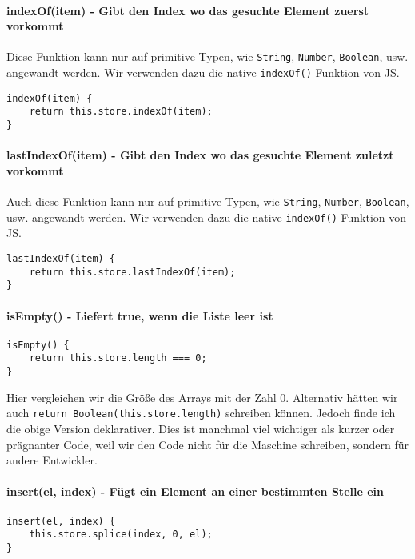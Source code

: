 \documentclass{book}
\begin{document}
\paragraph{indexOf(item) - Gibt den Index wo das gesuchte Element zuerst vorkommt} Diese Funktion kann nur auf primitive Typen, wie \lstinline|String|, \lstinline|Number|, \lstinline|Boolean|, usw. angewandt werden. Wir verwenden dazu die native \lstinline|indexOf()| Funktion von JS.
\begin{lstlisting}[caption=Array Konstruktor]
indexOf(item) {
	return this.store.indexOf(item);
}
\end{lstlisting}

\paragraph{lastIndexOf(item) - Gibt den Index wo das gesuchte Element zuletzt vorkommt} Auch diese Funktion kann nur auf primitive Typen, wie \lstinline|String|, \lstinline|Number|, \lstinline|Boolean|, usw. angewandt werden. Wir verwenden dazu die native \mbox{\lstinline|indexOf()|} Funktion von JS.
\begin{lstlisting}[caption=Array Konstruktor]
lastIndexOf(item) {
	return this.store.lastIndexOf(item);
}
\end{lstlisting}

\paragraph{isEmpty() - Liefert true, wenn die Liste leer ist} 
\begin{lstlisting}[caption=Array Konstruktor]
isEmpty() {
	return this.store.length === 0;
}
\end{lstlisting}
Hier vergleichen wir die Größe des Arrays mit der Zahl 0. Alternativ hätten wir auch \lstinline|return Boolean(this.store.length)| schreiben können. Jedoch finde ich die obige Version deklarativer. Dies ist manchmal viel wichtiger als kurzer oder prägnanter Code, weil wir den Code nicht für die Maschine schreiben, sondern für andere Entwickler.

\paragraph{insert(el, index) - Fügt ein Element an einer bestimmten Stelle ein} 
\begin{lstlisting}[caption=Array Konstruktor]
insert(el, index) {
	this.store.splice(index, 0, el);
}
\end{lstlisting}
\end{document}
